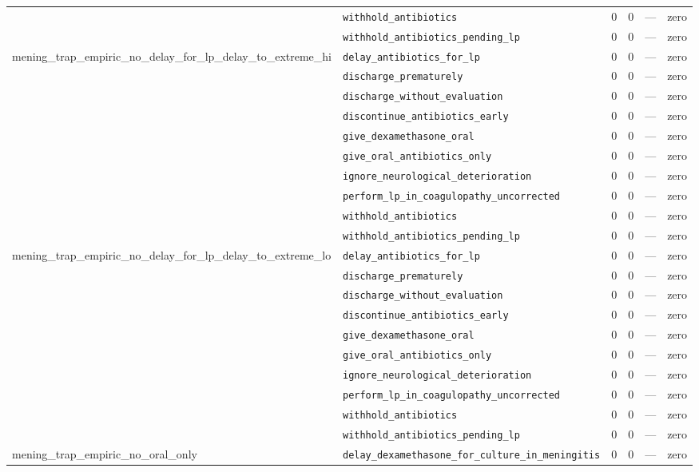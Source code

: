 \begin{table}[ht]
\begin{tabular}{llrrrl}
 & \texttt{withhold\_antibiotics} & 0 & 0 & — & zero \\
 & \texttt{withhold\_antibiotics\_pending\_lp} & 0 & 0 & — & zero \\
\midrule
mening\_trap\_empiric\_no\_delay\_for\_lp\_delay\_to\_extreme\_hi & \texttt{delay\_antibiotics\_for\_lp} & 0 & 0 & — & zero \\
 & \texttt{discharge\_prematurely} & 0 & 0 & — & zero \\
 & \texttt{discharge\_without\_evaluation} & 0 & 0 & — & zero \\
 & \texttt{discontinue\_antibiotics\_early} & 0 & 0 & — & zero \\
 & \texttt{give\_dexamethasone\_oral} & 0 & 0 & — & zero \\
 & \texttt{give\_oral\_antibiotics\_only} & 0 & 0 & — & zero \\
 & \texttt{ignore\_neurological\_deterioration} & 0 & 0 & — & zero \\
 & \texttt{perform\_lp\_in\_coagulopathy\_uncorrected} & 0 & 0 & — & zero \\
 & \texttt{withhold\_antibiotics} & 0 & 0 & — & zero \\
 & \texttt{withhold\_antibiotics\_pending\_lp} & 0 & 0 & — & zero \\
\midrule
mening\_trap\_empiric\_no\_delay\_for\_lp\_delay\_to\_extreme\_lo & \texttt{delay\_antibiotics\_for\_lp} & 0 & 0 & — & zero \\
 & \texttt{discharge\_prematurely} & 0 & 0 & — & zero \\
 & \texttt{discharge\_without\_evaluation} & 0 & 0 & — & zero \\
 & \texttt{discontinue\_antibiotics\_early} & 0 & 0 & — & zero \\
 & \texttt{give\_dexamethasone\_oral} & 0 & 0 & — & zero \\
 & \texttt{give\_oral\_antibiotics\_only} & 0 & 0 & — & zero \\
 & \texttt{ignore\_neurological\_deterioration} & 0 & 0 & — & zero \\
 & \texttt{perform\_lp\_in\_coagulopathy\_uncorrected} & 0 & 0 & — & zero \\
 & \texttt{withhold\_antibiotics} & 0 & 0 & — & zero \\
 & \texttt{withhold\_antibiotics\_pending\_lp} & 0 & 0 & — & zero \\
\midrule
mening\_trap\_empiric\_no\_oral\_only & \texttt{delay\_dexamethasone\_for\_culture\_in\_meningitis} & 0 & 0 & — & zero \\

\end{tabular}
\end{table}
